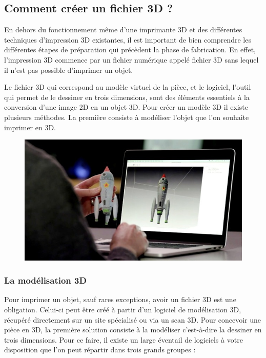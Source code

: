 \documentclass{article}
\begin{document}
\subsection{Comment créer un fichier 3D ?}
En dehors du fonctionnement même d'une imprimante 3D et des différentes techniques d'impression 3D existantes, il est important de bien comprendre les différentes étapes de préparation qui précèdent la phase de fabrication. En effet, l'impression 3D commence par un fichier numérique appelé fichier 3D sans lequel il n'est pas possible d'imprimer un objet.
 \par\leavevmode\par
Le fichier 3D qui correspond au modèle virtuel de la pièce, et le logiciel, l'outil qui permet de le dessiner en trois dimensions, sont des éléments essentiels à la conversion d'une image 2D en un objet 3D. Pour créer un modèle 3D il existe plusieurs méthodes. La première consiste à modéliser l'objet que l'on souhaite imprimer en 3D.
 \par\leavevmode\par
\begin{figure}[h!]
\centering
\includegraphics[scale=0.4]{./images/modelisation-3D.png}
\end{figure}\hfill
\subsubsection{La modélisation 3D}
Pour imprimer un objet, sauf rares exceptions, avoir un fichier 3D est une obligation. Celui-ci peut être créé à partir d'un logiciel de modélisation 3D, récupéré directement sur un site spécialisé ou via un scan 3D. Pour concevoir une pièce en 3D, la première solution consiste à la modéliser c'est-à-dire la dessiner en trois dimensions. Pour ce faire, il existe un large éventail de logiciels à votre disposition que l'on peut répartir dans trois grands groupes :
\end{document}
